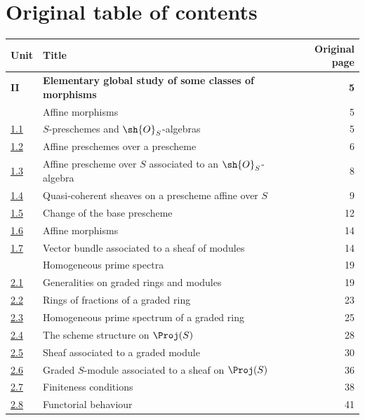 \section*{Original table of contents}

\begingroup
\small
\renewcommand{\arraystretch}{1.04}
\begin{longtable}{@{}p{}p{}r@{}}
\textbf{Unit} & \textbf{Title} & \textbf{Original page}\\
\hline
\textbf{II} & \textbf{Elementary global study of some classes of
morphisms} & \textbf{5}\\
\hyperref[section:II.1]{\textsection1} & Affine morphisms & 5\\
\hyperref[subsection:II.1.1]{1.1} & $S$-preschemes and $\sh{O}_S$-algebras & 5\\
\hyperref[subsection:II.1.2]{1.2} & Affine preschemes over a prescheme & 6\\
\hyperref[subsection:II.1.3]{1.3} & Affine prescheme over $S$ associated to an
$\sh{O}_S$-algebra & 8\\
\hyperref[subsection:II.1.4]{1.4} & Quasi-coherent sheaves on a prescheme affine over $S$ & 9\\
\hyperref[subsection:II.1.5]{1.5} & Change of the base prescheme & 12\\
\hyperref[subsection:II.1.6]{1.6} & Affine morphisms & 14\\
\hyperref[subsection:II.1.7]{1.7} & Vector bundle associated to a sheaf of modules & 14\\
\hyperref[section:II.2]{\textsection2} & Homogeneous prime spectra & 19\\
\hyperref[subsection:II.2.1]{2.1} & Generalities on graded rings and modules & 19\\
\hyperref[subsection:II.2.2]{2.2} & Rings of fractions of a graded ring & 23\\
\hyperref[subsection:II.2.3]{2.3} & Homogeneous prime spectrum of a graded ring & 25\\
\hyperref[subsection:II.2.4]{2.4} & The scheme structure on $\Proj(S)$ & 28\\
\hyperref[subsection:II.2.5]{2.5} & Sheaf associated to a graded module & 30\\
\hyperref[subsection:II.2.6]{2.6} & Graded $S$-module associated to a sheaf on $\Proj(S)$ & 36\\
\hyperref[subsection:II.2.7]{2.7} & Finiteness conditions & 38\\
\hyperref[subsection:II.2.8]{2.8} & Functorial behaviour & 41\\

\end{longtable}

